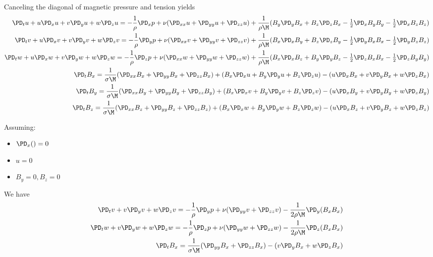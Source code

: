 \documentclass[11pt]{article}
\begin{document}
Canceling the diagonal of magnetic pressure and tension yields
\tiny\begin{equation}\begin{aligned}
\PD_t u+ u\PD_x u + v\PD_y u + w\PD_z u = -\frac{1}{\rho}\PD_x p+ \nu (\PD_{xx} u+\PD_{yy} u+\PD_{zz} u) + \frac{1}{\rho \M} (B_y \PD_y B_x + B_z \PD_z B_x-\tfrac{1}{2}\PD_x B_y B_y-\tfrac{1}{2}\PD_x B_z B_z) \\
\PD_t v+ u\PD_x v + v\PD_y v + w\PD_z v = -\frac{1}{\rho}\PD_y p+ \nu (\PD_{xx} v+\PD_{yy} v+\PD_{zz} v) + \frac{1}{\rho \M} (B_x \PD_x B_y + B_z \PD_z B_y-\tfrac{1}{2}\PD_y B_x B_x-\tfrac{1}{2}\PD_y B_z B_z) \\
\PD_t w+ u\PD_x w + v\PD_y w + w\PD_z w = -\frac{1}{\rho}\PD_z p+ \nu (\PD_{xx} w+\PD_{yy} w+\PD_{zz} w) + \frac{1}{\rho \M} (B_x \PD_x B_z + B_y \PD_y B_z-\tfrac{1}{2}\PD_z B_x B_x-\tfrac{1}{2}\PD_z B_y B_y) \\
\PD_t B_x = \frac{1}{\sigma \M} (\PD_{xx} B_x + \PD_{yy} B_x+\PD_{zz} B_x) + (B_x\PD_x u+B_y\PD_y u+B_z\PD_z u) - (u\PD_x B_x+v\PD_y B_x+w\PD_z B_x) \\
\PD_t B_y = \frac{1}{\sigma \M} (\PD_{xx} B_y + \PD_{yy} B_y+\PD_{zz} B_y) + (B_x\PD_x v+B_y\PD_y v+B_z\PD_z v) - (u\PD_x B_y+v\PD_y B_y+w\PD_z B_y) \\
\PD_t B_z = \frac{1}{\sigma \M} (\PD_{xx} B_z + \PD_{yy} B_z+\PD_{zz} B_z) + (B_x\PD_x w+B_y\PD_y w+B_z\PD_z w) - (u\PD_x B_z+v\PD_y B_z+w\PD_z B_z) \\
\end{aligned} \end{equation}\normalsize

Assuming:
\begin{itemize}
\item $\PD_x () = 0$
\item $u = 0$
\item $B_y=0,B_z=0$
\end{itemize}
We have
\begin{equation}\begin{aligned}
\PD_t v+ v\PD_y v + w\PD_z v = -\frac{1}{\rho}\PD_y p+ \nu (\PD_{yy} v+\PD_{zz} v) - \frac{1}{2 \rho \M} \PD_y (B_x B_x) \\
\PD_t w+ v\PD_y w + w\PD_z w = -\frac{1}{\rho}\PD_z p+ \nu (\PD_{yy} w+\PD_{zz} w) - \frac{1}{2 \rho \M} \PD_z (B_x B_x) \\
\PD_t B_x = \frac{1}{\sigma \M} (\PD_{yy} B_x+\PD_{zz} B_x)                           - (v\PD_y B_x+w\PD_z B_x) \\
\end{aligned} \end{equation}
\end{document}
